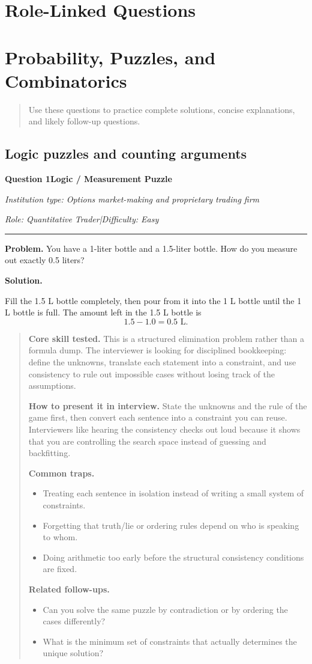 \documentclass[11pt,letterpaper,openany]{book}
\newcommand{\ChapterIntro}[1]{%
  \begin{quote}\small #1\end{quote}%
}
\newenvironment{EditorialNote}
  {\begin{quote}\small\setlength{\parskip}{0.25em}}
  {\end{quote}}
\newcommand{\QuestionSpacer}{\vspace{0.4em}}
\newcommand{\InterviewQuestionHeader}[5]{%
  \vspace{1.0em}%
  {\large\bfseries #1\enspace #4\par}%
  {\small\itshape Institution type: #2\par}%
  {\small\itshape Role: #3\enspace |\enspace Difficulty: #5\par}%
  \vspace{0.25em}\hrule\vspace{0.45em}%
}
\begin{document}
\section*{Role-Linked Questions}
\section{Probability, Puzzles, and Combinatorics}
\ChapterIntro{Use these questions to practice complete solutions, concise explanations, and likely follow-up questions.}

\subsection{Logic puzzles and counting arguments}

\InterviewQuestionHeader{Question 1}{Options market-making and proprietary trading firm}{Quantitative Trader}{Logic / Measurement Puzzle}{Easy}
\textbf{Problem.} You have a 1-liter bottle and a 1.5-liter bottle. How do you measure out exactly 0.5 liters?

\textbf{Solution.}

Fill the 1.5 L bottle completely, then pour from it into the 1 L bottle until the 1 L bottle is full. The amount left in the 1.5 L bottle is
\[
1.5 - 1.0 = 0.5 \text{ L}.
\]

\begin{EditorialNote}


\textbf{Core skill tested.} This is a structured elimination problem rather than a formula dump. The interviewer is looking for disciplined bookkeeping: define the unknowns, translate each statement into a constraint, and use consistency to rule out impossible cases without losing track of the assumptions.

\textbf{How to present it in interview.} State the unknowns and the rule of the game first, then convert each sentence into a constraint you can reuse. Interviewers like hearing the consistency checks out loud because it shows that you are controlling the search space instead of guessing and backfitting.

\textbf{Common traps.}
\begin{itemize}
\item Treating each sentence in isolation instead of writing a small system of constraints.
\item Forgetting that truth/lie or ordering rules depend on who is speaking to whom.
\item Doing arithmetic too early before the structural consistency conditions are fixed.
\end{itemize}

\textbf{Related follow-ups.}
\begin{itemize}
\item Can you solve the same puzzle by contradiction or by ordering the cases differently?
\item What is the minimum set of constraints that actually determines the unique solution?
\end{itemize}


\end{EditorialNote}
\QuestionSpacer
\end{document}
